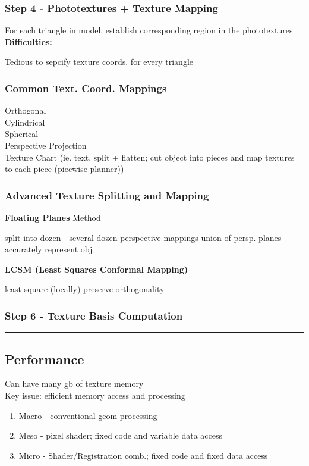 \documentclass{article}
\begin{document}
\subsubsection*{Step 4 - Phototextures + Texture Mapping}
For each triangle in model, establish corresponding region in the phototextures
\\
\textbf{Difficulties:}
\begin{outline}
  \1 Tedious to sepcify texture coords. for every triangle
\end{outline}

\subsubsection{Common Text. Coord. Mappings}
Orthogonal
\\
Cylindrical
\\
Spherical
\\
Perspective Projection
\\
Texture Chart (ie. text. split + flatten; cut object into pieces and map textures to each piece (piecwise planner))

\subsubsection{Advanced Texture Splitting and Mapping}
\textbf{Floating Planes} Method
\begin{outline}
  \1 split into dozen - several dozen perspective mappings
  \1 union of persp. planes accurately represent obj
\end{outline}
\noindent
\textbf{LCSM (Least Squares Conformal Mapping)}
\begin{outline}
  \1 least square (locally) preserve orthogonality
\end{outline}




\subsubsection*{Step 6 - Texture Basis Computation}


\noindent\rule{\textwidth}{0.1pt}

\subsection{Performance}
Can have many gb of texture memory
\\
Key issue: efficient memory access and processing
\begin{enumerate}
  \item Macro - conventional geom processing
  \item Meso - pixel shader; fixed code and variable data access
  \item Micro - Shader/Registration comb.; fixed code and fixed data access 
\end{enumerate}
\end{document}
